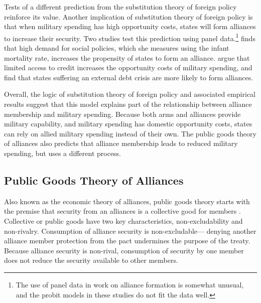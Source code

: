 \documentclass[12pt]{article}
\begin{document}
Tests of a different prediction from the substitution theory of foreign policy reinforce its value. 
Another implication of substitution theory of foreign policy is that when military spending has high opportunity costs, states will form alliances to increase their security. 
Two studies test this prediction using panel data.\footnote{The use of panel data in work on alliance formation is somewhat unusual, and the probit models in these studies do not fit the data well.}
\citet{Kimball2010} finds that high demand for social policies, which she measures using the infant mortality rate, increases the propensity of states to form an alliance.
\citet{AllenDigiuseppe2013} argue that limited access to credit increases the opportunity costs of military spending, and find that states suffering an external debt crisis are more likely to form alliances. 


Overall, the logic of substitution theory of foreign policy and associated empirical results suggest that this model explains part of the relationship between alliance membership and military spending. 
Because both arms and alliances provide military capability, and military spending has domestic opportunity costs, states can rely on allied military spending instead of their own. 
The public goods theory of alliances also predicts that alliance membership leads to reduced military spending, but uses a different process. 



\subsection{Public Goods Theory of Alliances} 

Also known as the economic theory of alliances, public goods theory starts with the premise that security from an alliances is a collective good for members \citep{OlsonZeckhauser1966}.
Collective or public goods have two key characteristics, non-excludability and non-rivalry. 
Consumption of alliance security is non-excludable--- denying another alliance member protection from the pact undermines the purpose of the treaty.  
Because alliance security is non-rival, consumption of security by one member does not reduce the security available to other members. 
\end{document}
